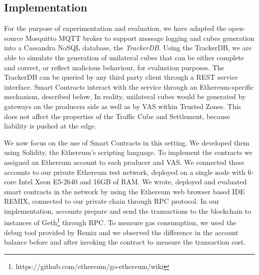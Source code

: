 \subsection{Implementation}
\label{sec:implementation}
For the purpose of experimentation and evaluation, we have adapted the open-source Mosquitto MQTT broker to support message logging and cubes generation into a Cassandra NoSQL database, the \textit{TrackerDB}.
Using the TrackerDB, we are able to simulate the generation of unilateral cubes that can be either complete and correct, or reflect malicious behaviour, for evaluation purposes.
The TrackerDB can be queried by any third party client through a REST service interface. Smart Contracts interact with the service through an Ethereum-specific mechanism, described below, 
In reality, unilateral cubes would be generated by gateways on the producers side as well as by VAS within Trusted Zones. This does not affect the properties of the Traffic Cube and Settlement, because liability is pushed at the edge.
%

We now focus on the use of Smart Contracts in this setting.  We developed them using Solidity, the Ethereum's scripting language. To implement the contracts we assigned an Ethereum account to each producer and VAS. We connected these accounts to our private Ethereum test network, deployed on a single node with 6-core Intel Xeon E5-2640 and 16GB of RAM. We wrote, deployed and evaluated smart contracts in the network by using the Ethereum web browser based IDE REMIX, connected to our private chain through RPC protocol. In our implementation, accounts prepare and send the transactions to the blockchain to instances of Geth\footnote{https://github.com/ethereum/go-ethereum/wiki } through RPC. To measure gas consumption, we used the debug tool provided by Remix and we observed the difference in the account balance before and after invoking the contract to measure the transaction cost.

